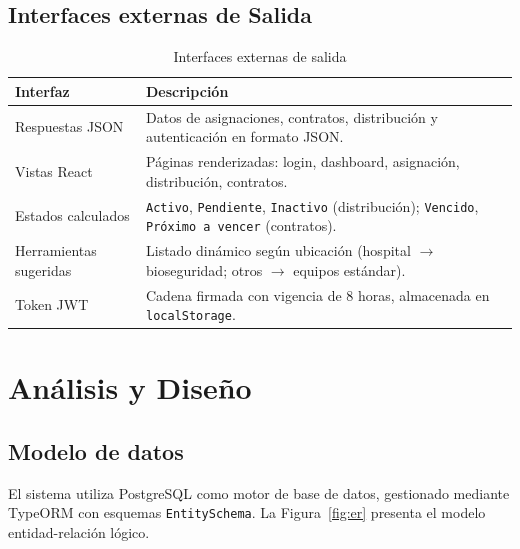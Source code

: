 \documentclass[12pt,a4paper]{report}
\begin{document}
\section{Interfaces externas de Salida}

\begin{table}[htbp]
  \centering
  \caption{Interfaces externas de salida}
  \label{tab:salida}
  \begin{tabular}{@{}p{3.5cm}p{9cm}@{}}
    \toprule
    \textbf{Interfaz} & \textbf{Descripción} \\
    \midrule
    Respuestas JSON & Datos de asignaciones, contratos, distribución y autenticación en formato JSON. \\
    Vistas React & Páginas renderizadas: login, dashboard, asignación, distribución, contratos. \\
    Estados calculados & \texttt{Activo}, \texttt{Pendiente}, \texttt{Inactivo} (distribución); \texttt{Vencido}, \texttt{Próximo a vencer} (contratos). \\
    Herramientas sugeridas & Listado dinámico según ubicación (hospital $\rightarrow$ bioseguridad; otros $\rightarrow$ equipos estándar). \\
    Token JWT & Cadena firmada con vigencia de 8 horas, almacenada en \texttt{localStorage}. \\
    \bottomrule
  \end{tabular}
\end{table}

\clearpage
\chapter{Análisis y Diseño}

\section{Modelo de datos}

El sistema utiliza PostgreSQL como motor de base de datos, gestionado mediante TypeORM con esquemas \texttt{EntitySchema}. La Figura~\ref{fig:er} presenta el modelo entidad-relación lógico.
\end{document}
